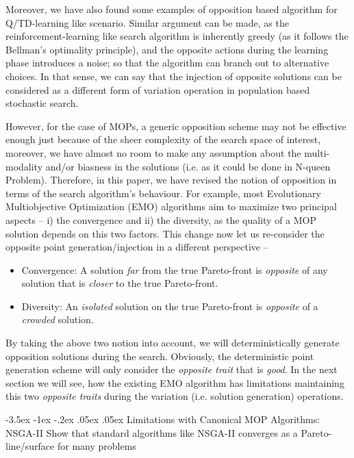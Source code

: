 \documentclass[11pt]{article}
\makeatletter
\renewcommand\section{\@startsection{section}{1}{\z@}%
                                  {-3.5ex \@plus -1ex \@minus -.2ex}%
                                  {.05ex \@plus.05ex}%
                                  {\normalfont\large\bf}}
\makeatother
\begin{document}
Moreover, we have also found some examples of opposition based algorithm for Q/TD-learning like scenario. Similar argument can be made, as the reinforcement-learning like search algorithm is inherently greedy (as it follows the Bellman's optimality principle), and the opposite actions during the learning phase introduces a noise; so that the algorithm can branch out to alternative choices. In that sense, we can say that the injection of opposite solutions can be considered as a different form of variation operation in population based stochastic search. 

However, for the case of MOPs, a generic opposition scheme may not be effective enough just because of the sheer complexity of the search space of interest, moreover, we have almost no room to make any assumption about the multi-modality and/or biasness in the solutions (i.e. as it could be done in N-queen Problem). Therefore, in this paper, we have revised the notion of opposition in terms of the search algorithm's behaviour. For example, most Evolutionary Multiobjective Optimization (EMO) algorithms aim to maximize two principal aspects -- i) the convergence and ii) the diversity, as the quality of a MOP solution depends on this two factors. This change now let us re-consider the opposite point generation/injection in a different perspective --
\begin{itemize}
	\item Convergence: A solution \textit{far} from the true Pareto-front is \textit{opposite} of any solution that is \textit{closer} to the true Pareto-front.
	\item Diversity: An \textit{isolated} solution on the true Pareto-front is \textit{opposite} of a \textit{crowded} solution. 
\end{itemize}

By taking the above two notion into account, we will deterministically generate opposition solutions during the search. Obviously, the deterministic point generation scheme will only consider the \textit{opposite trait} that is \textit{good}. In the next section we will see, how the existing EMO algorithm has limitations maintaining this two \textit{opposite traits} during the variation (i.e. solution generation) operations.  

\section{Limitations with Canonical MOP Algorithms: NSGA-II}
Show that standard algorithms like NSGA-II converges as a Pareto-line/surface for many problems
\end{document}
